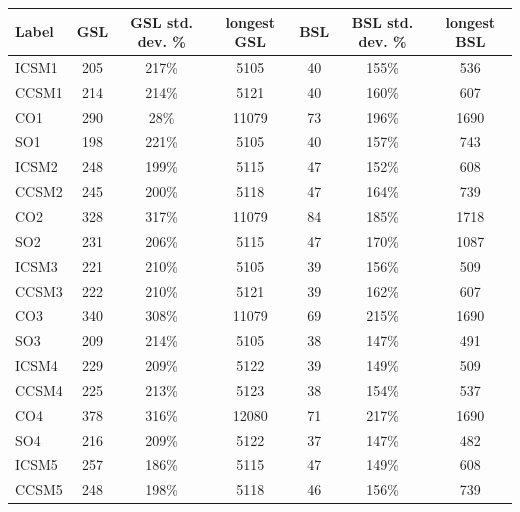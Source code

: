 \begin{table}
  \begin{tabular}{| l | c | c | c | c | c | c |}\hline
    Label & GSL & GSL std. dev. \% & longest GSL & BSL & BSL std. dev. \% & longest BSL  \\\hline
    ICSM1 & 205 & 217\% & 5105 & 40 & 155\% & 536 \\\hline
    CCSM1 & 214 & 214\% & 5121 & 40 & 160\% & 607 \\\hline
    CO1 & 290 & 28\% & 11079 & 73 & 196\% & 1690 \\\hline
    SO1 & 198 & 221\% & 5105 & 40 & 157\% & 743 \\\hline
%
    ICSM2 & 248 & 199\% & 5115 & 47 & 152\% & 608 \\\hline
    CCSM2 &245 & 200\% & 5118 & 47 & 164\% & 739 \\\hline
    CO2 & 328 & 317\% & 11079 & 84 & 185\% & 1718 \\\hline
    SO2 & 231 & 206\% & 5115 & 47 & 170\% & 1087 \\\hline
%
    ICSM3 & 221 & 210\% & 5105 & 39 & 156\% & 509 \\\hline
    CCSM3 & 222 & 210\% & 5121 & 39 & 162\% & 607 \\\hline
    CO3 & 340 & 308\% & 11079 & 69 & 215\% & 1690 \\\hline
    SO3 & 209 & 214\% & 5105 & 38 & 147\% & 491 \\\hline
%
    ICSM4 & 229 & 209\% & 5122 & 39 & 149\% & 509 \\\hline
    CCSM4 & 225 & 213\% & 5123 & 38 & 154\% & 537 \\\hline
    CO4 & 378 & 316\% & 12080 & 71 & 217\% & 1690 \\\hline
    SO4 & 216 & 209\% & 5122 & 37 & 147\% & 482 \\\hline
%
    ICSM5 & 257 & 186\% & 5115 & 47 & 149\% & 608 \\\hline
    CCSM5 & 248 & 198\% & 5118 & 46 & 156\% & 739 \\\hline

\end{tabular}
\end{table}
